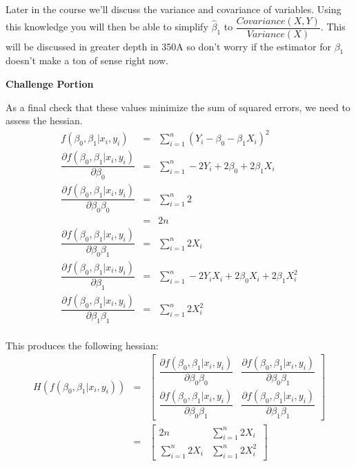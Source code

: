 \documentclass[10pt]{amsart}
\begin{document}
Later in the course we'll discuss the variance and covariance of variables. Using this knowledge you will then be able to simplify $\hat \beta_1$ to $\dfrac{Covariance (X,Y)}{Variance(X)}$. This will be discussed in greater depth in 350A so don't worry if the estimator for $\beta_1$ doesn't make a ton of sense right now. 

\textbf{Challenge Portion}

As a final check that these values minimize the sum of squared errors, we need to assess the hessian. 
\begin{eqnarray*}
 f(\beta_0, \beta_1 | x_i, y_i) &=& \sum_{i=1}^n (Y_i - \beta_0 - \beta_1 X_i )^2\\
 \dfrac{\partial{ f(\beta_0, \beta_1 | x_i, y_i)}}{\partial \beta_0} &=& \sum_{i=1}^n -2Y_i + 2\beta_0 + 2\beta_1 X_i\\
 \dfrac{\partial{ f(\beta_0, \beta_1 | x_i, y_i)}}{\partial \beta_0 \beta_0} &=& \sum_{i=1}^n 2\\
 &=& 2n\\
  \dfrac{\partial{ f(\beta_0, \beta_1 | x_i, y_i)}}{\partial \beta_0 \beta_1} &=& \sum_{i=1}^n 2X_i\\
  \dfrac{\partial{ f(\beta_0, \beta_1 | x_i, y_i)}}{\partial \beta_1} &=& \sum_{i=1}^n -2Y_iX_i + 2\beta_0X_i + 2\beta_1 X_i^2\\
    \dfrac{\partial{ f(\beta_0, \beta_1 | x_i, y_i)}}{\partial \beta_1 \beta_1} &=& \sum_{i=1}^n 2 X_i^2\\
\end{eqnarray*} 

This produces the following hessian:
 \begin{eqnarray*}
H(  f(\beta_0, \beta_1 | x_i, y_i) ) &=& \begin{bmatrix}  \dfrac{\partial{ f(\beta_0, \beta_1 | x_i, y_i)}}{\partial \beta_0 \beta_0} &  \dfrac{\partial{ f(\beta_0, \beta_1 | x_i, y_i)}}{\partial \beta_0 \beta_1}  \\
 \dfrac{\partial{ f(\beta_0, \beta_1 | x_i, y_i)}}{\partial \beta_0 \beta_1}  &  \dfrac{\partial{ f(\beta_0, \beta_1 | x_i, y_i)}}{\partial \beta_1 \beta_1} \end{bmatrix}\\
&=& \begin{bmatrix} 2n & \sum_{i=1}^n 2X_i\ \\
\sum_{i=1}^n 2X_i & \sum_{i=1}^n  2 X_i^2 \end{bmatrix}\\
\end{eqnarray*}
\end{document}
